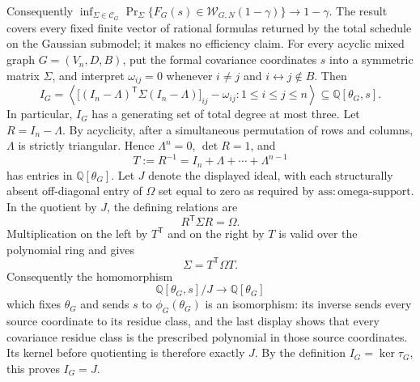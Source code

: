 Consequently \(\inf_{\Sigma\in\mathcal C_G}\Pr_{\Sigma}\{F_G(s)\in\mathcal W_{G,N}(1-\gamma)\}\to1-\gamma\). The result covers every fixed finite vector of rational formulas returned by the total schedule on the Gaussian submodel; it makes no efficiency claim.
For every acyclic mixed graph \(G=(V_n,D,B)\), put the formal covariance coordinates \(s\) into a symmetric matrix \(\Sigma\), and interpret \(\omega_{ij}=0\) whenever \(i\neq j\) and \(i\leftrightarrow j\notin B\).  Then
\[
 I_G=\left\langle
 \bigl[(I_n-\Lambda)^{\mathsf T}\Sigma(I_n-\Lambda)\bigr]_{ij}-\omega_{ij}:1\leq i\leq j\leq n
 \right\rangle
 \subseteq\mathbb Q[\theta_G,s].
\]
In particular, \(I_G\) has a generating set of total degree at most three.
Let \(R=I_n-\Lambda\).  By acyclicity, after a simultaneous permutation of rows and columns, \(\Lambda\) is strictly triangular.  Hence \(\Lambda^n=0\), \(\det R=1\), and
\[
 T:=R^{-1}=I_n+\Lambda+\cdots+\Lambda^{n-1}
\]
has entries in \(\mathbb Q[\theta_G]\).  Let \(J\) denote the displayed ideal, with each structurally absent off-diagonal entry of \(\Omega\) set equal to zero as required by \(\mathrm{ass:omega\mbox{-}support}\).  In the quotient by \(J\), the defining relations are
\[
 R^{\mathsf T}\Sigma R=\Omega.
\]
Multiplication on the left by \(T^{\mathsf T}\) and on the right by \(T\) is valid over the polynomial ring and gives
\[
 \Sigma=T^{\mathsf T}\Omega T.
\]
Consequently the homomorphism
\[
 \mathbb Q[\theta_G,s]/J\longrightarrow\mathbb Q[\theta_G]
\]
which fixes \(\theta_G\) and sends \(s\) to \(\phi_G(\theta_G)\) is an isomorphism: its inverse sends every source coordinate to its residue class, and the last display shows that every covariance residue class is the prescribed polynomial in those source coordinates.  Its kernel before quotienting is therefore exactly \(J\).  By the definition \(I_G=\ker\tau_G\), this proves \(I_G=J\).


